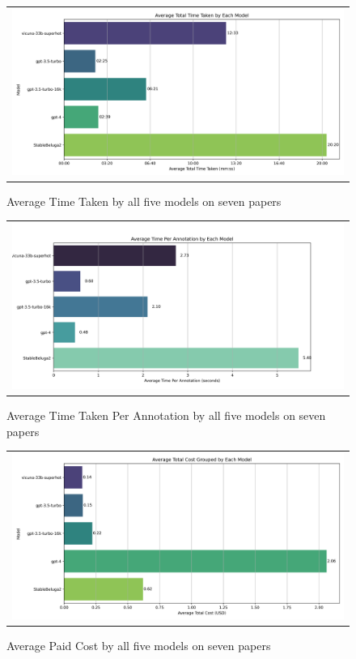 \begin{figure}[htpb]
  \centering
  \begin{tabular}{c}
  \includegraphics[width=14cm]{images/open-runtime.png}
  \end{tabular}
  \caption[Open Source Time]{Average Time Taken by all five models on seven papers}\label{fig:open-runtime}
\end{figure}

\begin{figure}[htpb]
  \centering
  \begin{tabular}{c}
  \includegraphics[width=14cm]{images/open-anno-cost.png}
  \end{tabular}
  \caption[Open Source Cost]{Average Time Taken Per Annotation by all five models on seven papers}\label{fig:open-relative-cost}
\end{figure}

\begin{figure}[htpb]
  \centering
  \begin{tabular}{c}
  \includegraphics[width=14cm]{images/open-cost.png}
  \end{tabular}
  \caption[Open Source Time]{Average Paid Cost by all five models on seven papers}\label{fig:open-cost}
\end{figure}

